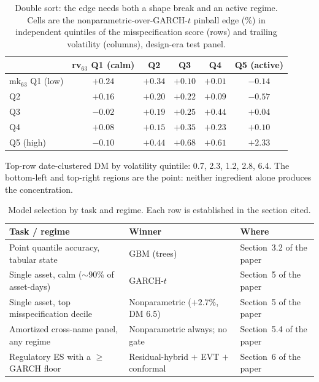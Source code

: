 \documentclass[11pt]{article}
\begin{document}
\begin{table}[htbp]
\centering
\begin{threeparttable}
\caption{Double sort: the edge needs both a shape break and an active
regime. Cells are the nonparametric-over-GARCH-$t$ pinball edge (\%)
in independent quintiles of the misspecification score (rows) and
trailing volatility (columns), design-era test panel.}
\label{tab:doublesort}
\footnotesize\setlength{\tabcolsep}{5pt}
\begin{tabular}{lccccc}
\toprule
 & rv$_{63}$ Q1 (calm) & Q2 & Q3 & Q4 & Q5 (active) \\
\midrule
mk$_{63}$ Q1 (low) & $+0.24$ & $+0.34$ & $+0.10$ & $+0.01$ & $-0.14$ \\
Q2 & $+0.16$ & $+0.20$ & $+0.22$ & $+0.09$ & $-0.57$ \\
Q3 & $-0.02$ & $+0.19$ & $+0.25$ & $+0.44$ & $+0.04$ \\
Q4 & $+0.08$ & $+0.15$ & $+0.35$ & $+0.23$ & $+0.10$ \\
Q5 (high) & $-0.10$ & $+0.44$ & $+0.68$ & $+0.61$ & $\mathbf{+2.33}$ \\
\bottomrule
\end{tabular}
\begin{tablenotes}\footnotesize
\item Top-row date-clustered DM by volatility quintile: 0.7, 2.3, 1.2,
2.8, 6.4. The bottom-left and top-right regions are the point:
neither ingredient alone produces the concentration.
\end{tablenotes}
\end{threeparttable}
\end{table}
\begin{table}[htbp]
\centering\small
\caption{Model selection by task and regime.
Each row is established in the section cited.}
\label{tab:decision}
\begin{tabular}{p{}p{}l}
\toprule
Task / regime & Winner & Where \\
\midrule
Point quantile accuracy, tabular state & GBM (trees) & Section~3.2 of the paper \\
Single asset, calm ($\sim$90\% of asset-days) & GARCH-$t$ & Section~5 of the paper \\
Single asset, top misspecification decile & Nonparametric ($+2.7\%$, DM 6.5) & Section~5 of the paper \\
Amortized cross-name panel, any regime & Nonparametric always; no gate & Section~5.4 of the paper \\
Regulatory ES with a $\ge$GARCH floor & Residual-hybrid $+$ EVT $+$ conformal & Section~6 of the paper \\
\bottomrule
\end{tabular}
\end{table}
\end{document}
